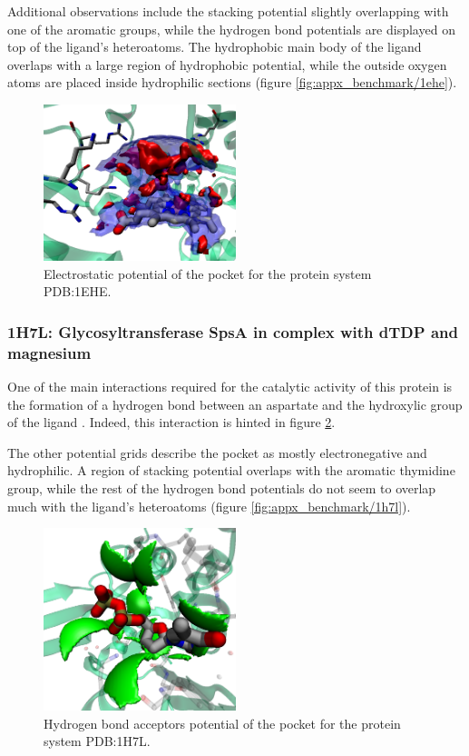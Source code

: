       Additional observations include the stacking potential slightly overlapping with one of the aromatic groups, while the hydrogen bond potentials are displayed on top of the ligand's heteroatoms. The hydrophobic main body of the ligand overlaps with a large region of hydrophobic potential, while the outside oxygen atoms are placed inside hydrophilic sections (figure \ref{fig:appx_benchmark/1ehe}).

      \begin{figure}[H]
        \centering
        \includegraphics[width=0.5\textwidth]{figures/results/benchmark_prot/1ehe.png}
        \caption{\label{fig:benchmark/1ehe} Electrostatic potential of the pocket for the protein system PDB:1EHE.}
      \end{figure}
    \pagebreak

    \subsubsection{1H7L: Glycosyltransferase SpsA in complex with dTDP and magnesium}
      One of the main interactions required for the catalytic activity of this protein is the formation of a hydrogen bond between an aspartate and the hydroxylic group of the ligand \cite{benchmark_1h7l_2001}. Indeed, this interaction is hinted in figure \ref{fig:benchmark/1h7l}.

      The other potential grids describe the pocket as mostly electronegative and hydrophilic. A region of stacking potential overlaps with the aromatic thymidine group, while the rest of the hydrogen bond potentials do not seem to overlap much with the ligand's heteroatoms (figure \ref{fig:appx_benchmark/1h7l}).

      \begin{figure}[H]
        \centering
        \includegraphics[width=0.5\textwidth]{figures/results/benchmark_prot/1h7l.png}
        \caption{\label{fig:benchmark/1h7l} Hydrogen bond acceptors potential of the pocket for the protein system PDB:1H7L.}
      \end{figure}
    \pagebreak

